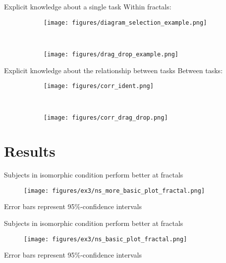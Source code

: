 \documentclass{beamer}
\begin{document}

\begin{frame}{Explicit knowledge about a single task}
Within fractals:
\begin{figure}
\centering
\begin{subfigure}{0.45\textwidth}
\texttt{[image: figures/diagram\_selection\_example.png]}
\end{subfigure}~
\begin{subfigure}{0.45\textwidth}
\texttt{[image: figures/drag\_drop\_example.png]}
\end{subfigure}
\end{figure}
\end{frame}

\begin{frame}{Explicit knowledge about the relationship between tasks}
Between tasks:
\begin{figure}
\centering
\begin{subfigure}{0.45\textwidth}
\texttt{[image: figures/corr\_ident.png]}
\end{subfigure}~
\begin{subfigure}{0.45\textwidth}
\texttt{[image: figures/corr\_drag\_drop.png]}
\end{subfigure}
\end{figure}
\end{frame}

\section{Results}
\begin{frame}{Subjects in isomorphic condition perform better at fractals}
\begin{figure}
\centering
\texttt{[image: figures/ex3/ns\_more\_basic\_plot\_fractal.png]}
\end{figure}
{\scriptsize Error bars represent 95\%-confidence intervals}
\end{frame}

\begin{frame}{Subjects in isomorphic condition perform better at fractals}
\begin{figure}
\centering
\texttt{[image: figures/ex3/ns\_basic\_plot\_fractal.png]}
\end{figure}
{\scriptsize Error bars represent 95\%-confidence intervals}
\end{frame}
\end{document}
